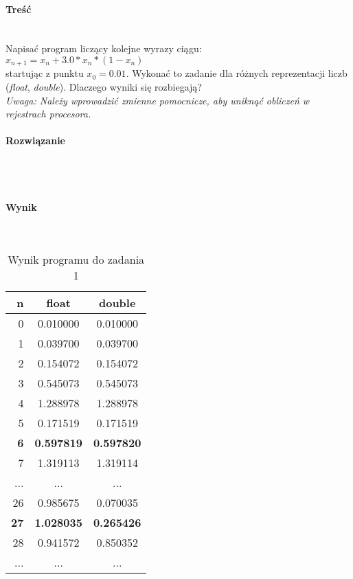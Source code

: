\paragraph{Treść} ~\\
Napisać program liczący kolejne wyrazy ciągu: \\
$ x_{n+1} = x_{n} + 3.0 * x_{n} * (1 - x_{n}) $ \\
startując z punktu $ x_{0} = 0.01 $.
Wykonać to zadanie dla różnych reprezentacji liczb (\textit{float}, \textit{double}).
Dlaczego wyniki się rozbiegają? \\
\textit{Uwaga: Należy wprowadzić zmienne pomocnicze, aby uniknąć obliczeń w rejestrach procesora.} \\

\paragraph{Rozwiązanie} ~\\
 ~\\

\paragraph{Wynik} ~\\
\begin{table}[h]
  \centering
  \begin{tabular}{r|c|c}
    n & float & double \\
    \hline 0 & 0.010000 & 0.010000 \\
    \hline 1 & 0.039700 & 0.039700 \\
    \hline 2 & 0.154072 & 0.154072 \\
    \hline 3 & 0.545073 & 0.545073 \\
    \hline 4 & 1.288978 & 1.288978 \\
    \hline 5 & 0.171519 & 0.171519 \\
    \hline \textbf{6} & \textbf{0.597819} & \textbf{0.597820} \\
    \hline 7 & 1.319113 & 1.319114 \\
    \hline ... & ... & ... \\
    \hline 26 & 0.985675 & 0.070035 \\
    \hline \textbf{27} & \textbf{1.028035} & \textbf{0.265426} \\
    \hline 28 & 0.941572 & 0.850352 \\
    \hline ... & ... & ... \\
  \end{tabular}
  \caption{Wynik programu do zadania 1}
  \label{tab:WynikProgramuDoZadania1}
\end{table}

